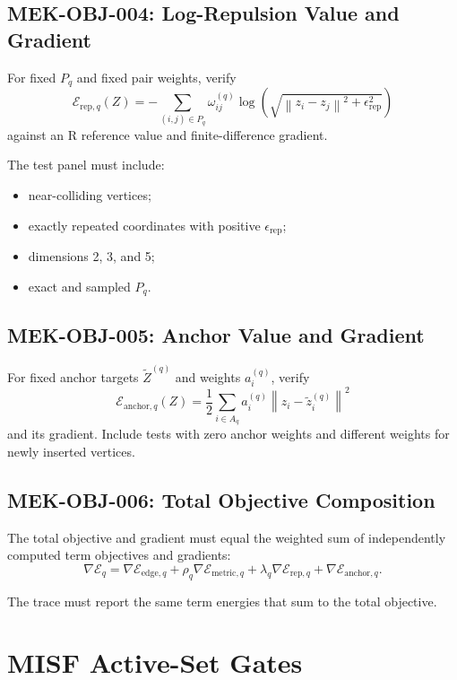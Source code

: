 \documentclass[11pt]{article}
\newcommand{\norm}[1]{\left\lVert #1 \right\rVert}
\begin{document}
\subsection{MEK-OBJ-004: Log-Repulsion Value and Gradient}

For fixed \(P_q\) and fixed pair weights, verify
\[
  \mathcal{E}_{\mathrm{rep},q}(Z)
  =
  -
  \sum_{(i,j)\in P_q}
  \omega_{ij}^{(q)}
  \log\left(
    \sqrt{\norm{z_i-z_j}^2+\epsilon_{\mathrm{rep}}^2}
  \right)
\]
against an R reference value and finite-difference gradient.

The test panel must include:
\begin{itemize}[leftmargin=2em]
  \item near-colliding vertices;
  \item exactly repeated coordinates with positive \(\epsilon_{\mathrm{rep}}\);
  \item dimensions 2, 3, and 5;
  \item exact and sampled \(P_q\).
\end{itemize}

\subsection{MEK-OBJ-005: Anchor Value and Gradient}

For fixed anchor targets \(\tilde{Z}^{(q)}\) and weights \(a_i^{(q)}\), verify
\[
  \mathcal{E}_{\mathrm{anchor},q}(Z)
  =
  \frac{1}{2}
  \sum_{i\in A_q}
  a_i^{(q)}
  \norm{z_i-\tilde{z}_i^{(q)}}^2
\]
and its gradient. Include tests with zero anchor weights and different weights
for newly inserted vertices.

\subsection{MEK-OBJ-006: Total Objective Composition}

The total objective and gradient must equal the weighted sum of independently
computed term objectives and gradients:
\[
  \nabla \mathcal{E}_q
  =
  \nabla\mathcal{E}_{\mathrm{edge},q}
  +
  \rho_q\nabla\mathcal{E}_{\mathrm{metric},q}
  +
  \lambda_q\nabla\mathcal{E}_{\mathrm{rep},q}
  +
  \nabla\mathcal{E}_{\mathrm{anchor},q}.
\]

The trace must report the same term energies that sum to the total objective.

\section{MISF Active-Set Gates}
\end{document}
